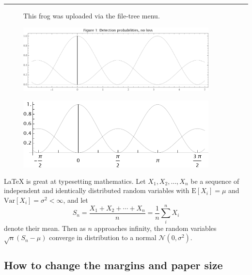 \documentclass{article}
\begin{document}
\vspace{10pt} %
\hrule


\begin{figure}
   \centering
   \caption{\label{fig:frog}This frog was uploaded via the file-tree menu.}
   \end{figure}




\begin{figure}[htbp]
\centering
\includegraphics[width=0.9\textwidth]{figure/2024-08-25-16-28-48.png}
\label{fig:2024-08-25-16-28-48}
\end{figure}




\begin{figure}[htbp]
\centering
\includegraphics[width=0.9\textwidth]{figure/2024-08-25-17-11-08.png}
\label{fig:2024-08-25-17-11-08}
\end{figure}




\LaTeX{} is great at typesetting mathematics. Let $X_1, X_2, \ldots, X_n$ be a sequence of independent and identically distributed random variables with $\text{E}[X_i] = \mu$ and $\text{Var}[X_i] = \sigma^2 < \infty$, and let
\[S_n = \frac{X_1 + X_2 + \cdots + X_n}{n}
      = \frac{1}{n}\sum_{i}^{n} X_i\]
denote their mean. Then as $n$ approaches infinity, the random variables $\sqrt{n}(S_n - \mu)$ converge in distribution to a normal $\mathcal{N}(0, \sigma^2)$.


\subsection{How to change the margins and paper size}
\end{document}
